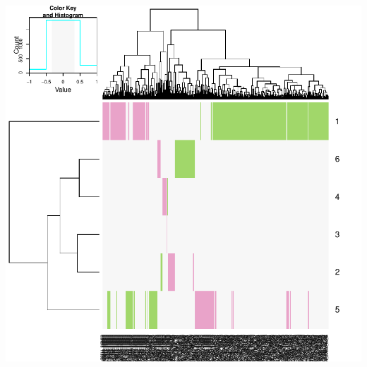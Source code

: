 \documentclass{article}\usepackage[]{graphicx}\usepackage[]{color}
\makeatletter
\def\maxwidth{ %
  \ifdim\Gin@nat@width>\linewidth
    \linewidth
  \else
    \Gin@nat@width
  \fi
}
\newenvironment{knitrout}{}{} %
\makeatother
\begin{document}
\begin{knitrout}
{\centering \includegraphics[width=\maxwidth]{figure/nmf-msigdb-cor-plots-2} 

}



\end{knitrout}
\end{document}
